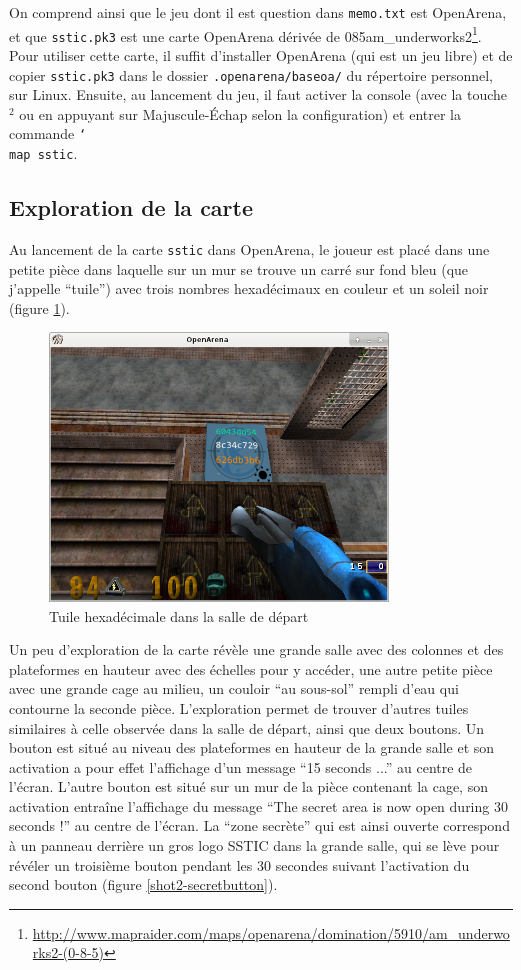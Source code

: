 \documentclass[a4paper,10pt]{article}
\newcommand{\bksl}{\char`\\} %
\begin{document}
On comprend ainsi que le jeu dont il est question dans \texttt{memo.txt} est OpenArena, et que \texttt{sstic.pk3} est une carte OpenArena dérivée de 085am\_underworks2\footnote{\url{http://www.mapraider.com/maps/openarena/domination/5910/am_underworks2-(0-8-5)}}.
Pour utiliser cette carte, il suffit d'installer OpenArena (qui est un jeu libre) et de copier \texttt{sstic.pk3} dans le dossier \texttt{.openarena/baseoa/} du répertoire personnel, sur Linux.
Ensuite, au lancement du jeu, il faut activer la console (avec la touche $^2$ ou en appuyant sur Majuscule-Échap selon la configuration) et entrer la commande \texttt{\bksl{}map sstic}.

\subsection{Exploration de la carte}

Au lancement de la carte \texttt{sstic} dans OpenArena, le joueur est placé dans une petite pièce dans laquelle sur un mur se trouve un carré sur fond bleu (que j'appelle ``tuile'') avec trois nombres hexadécimaux en couleur et un soleil noir (figure \ref{shot2-sun}).

\begin{figure}[ht]
  \centering
  \includegraphics[width=9cm]{stage2/oashot-sun.png}
  \caption{Tuile hexadécimale dans la salle de départ}
  \label{shot2-sun}
\end{figure}

Un peu d'exploration de la carte révèle une grande salle avec des colonnes et des plateformes en hauteur avec des échelles pour y accéder, une autre petite pièce avec une grande cage au milieu, un couloir ``au sous-sol'' rempli d'eau qui contourne la seconde pièce.
L'exploration permet de trouver d'autres tuiles similaires à celle observée dans la salle de départ, ainsi que deux boutons.
Un bouton est situé au niveau des plateformes en hauteur de la grande salle et son activation a pour effet l'affichage d'un message ``15 seconds ...'' au centre de l'écran.
L'autre bouton est situé sur un mur de la pièce contenant la cage, son activation entraîne l'affichage du message ``The secret area is now open during 30 seconds !'' au centre de l'écran.
La ``zone secrète'' qui est ainsi ouverte correspond à un panneau derrière un gros logo SSTIC dans la grande salle, qui se lève pour révéler un troisième bouton pendant les 30 secondes suivant l'activation du second bouton (figure \ref{shot2-secretbutton}).
\end{document}
